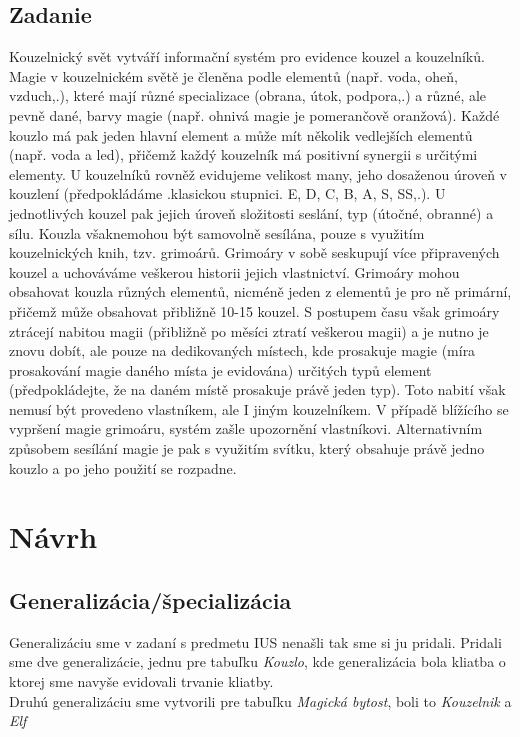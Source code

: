 \documentclass{article}
\begin{document}
    \subsection{Zadanie}
    \Large{Kouzelnický svět vytváří informační systém pro evidence kouzel a kouzelníků. Magie v kouzelnickém světě je členěna podle elementů (např. voda, oheň, vzduch,.), které mají různé specializace (obrana, útok, podpora,.) a různé, ale pevně dané, barvy magie (např. ohnivá magie je pomerančově oranžová). Každé kouzlo má pak jeden hlavní element a může mít několik vedlejších elementů (např. voda a led), přičemž každý kouzelník má positivní synergii s určitými elementy. U kouzelníků rovněž evidujeme velikost many, jeho dosaženou úroveň v kouzlení (předpokládáme .klasickou stupnici. E, D, C, B, A, S, SS,.). U jednotlivých kouzel pak jejich úroveň složitosti seslání, typ (útočné, obranné) a sílu. Kouzla všaknemohou být samovolně sesílána, pouze s využitím kouzelnických knih, tzv. grimoárů. Grimoáry v sobě seskupují více připravených kouzel a uchováváme veškerou historii jejich vlastnictví. Grimoáry mohou obsahovat kouzla různých elementů, nicméně jeden z elementů je pro ně primární, přičemž může obsahovat přibližně 10-15 kouzel. S postupem času však grimoáry ztrácejí nabitou magii (přibližně po měsíci ztratí veškerou magii) a je nutno je znovu dobít, ale pouze na dedikovaných místech, kde prosakuje magie (míra prosakování magie daného místa je evidována) určitých typů element (předpokládejte, že na daném místě prosakuje právě jeden typ). Toto nabití však nemusí být provedeno vlastníkem, ale I jiným kouzelníkem. V případě blížícího se vypršení magie grimoáru, systém zašle upozornění vlastníkovi. Alternativním způsobem sesílání magie je pak s využitím svítku, který obsahuje právě jedno kouzlo a po jeho použití se rozpadne.}              
    \newpage
    
    \section{Návrh}
    \subsection{Generalizácia/špecializácia}
    \Large{Generalizáciu sme v zadaní s predmetu IUS nenašli tak sme si ju pridali. Pridali sme dve generalizácie, jednu pre tabuľku \textit{Kouzlo}, kde generalizácia bola kliatba o ktorej sme navyše evidovali trvanie kliatby.}\\
    \Large{Druhú generalizáciu sme vytvorili pre tabuľku \textit{Magická bytost}, boli to \textit{Kouzelnik} a \textit{Elf}}
\end{document}
